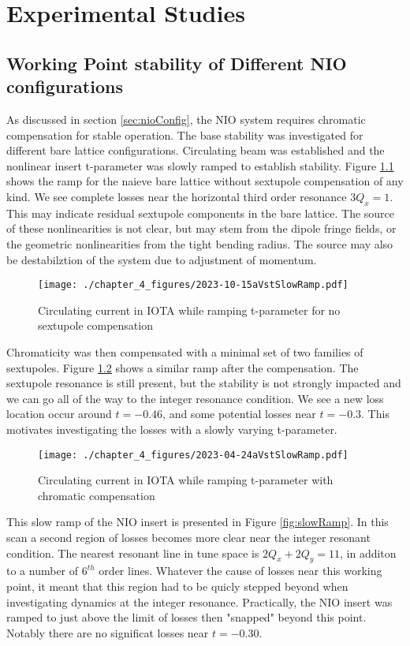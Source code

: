 \chapter{Experimental Studies} \label{chap:expResults}

\section{Working Point stability of Different NIO configurations} \label{sec:nioWorkPoint}
As discussed in section \ref{sec:nioConfig}, the NIO system requires chromatic compensation for stable operation. The base stability was investigated for different bare lattice configurations. Circulating beam was established and the nonlinear insert t-parameter was slowly ramped to establish stability. Figure \ref{fig:bareRamp} shows the ramp for the naieve bare lattice without sextupole compensation of any kind. We see complete losses near the horizontal third order resonance $3 Q_x = 1$. This may indicate residual sextupole components in the bare lattice. The source of these nonlinearities is not clear, but may stem from the dipole fringe fields, or the geometric nonlinearities from the tight bending radius. The source may also be destabilztion of the system due to adjustment of momentum.

\begin{figure}
	\centering
	\texttt{[image: ./chapter\_4\_figures/2023-10-15aVstSlowRamp.pdf]}
	\caption{Circulating current in IOTA while ramping t-parameter for no sextupole compensation}
	\label{fig:bareRamp}
\end{figure}


Chromaticity was then compensated with a minimal set of two families of sextupoles. Figure \ref{fig:midRamp} shows a similar ramp after the compensation. The sextupole resonance is still present, but the stability is not strongly impacted and we can go all of the way to the integer resonance condition. We see a new loss location occur around $t=-0.46$, and some potential losses near $t=-0.3$. This motivates investigating the losses with a slowly varying t-parameter.

\begin{figure}
	\centering
	\texttt{[image: ./chapter\_4\_figures/2023-04-24aVstSlowRamp.pdf]}
	\caption{Circulating current in IOTA while ramping t-parameter with chromatic compensation}
	\label{fig:midRamp}
\end{figure}


This slow ramp of the NIO insert is presented in Figure \ref{fig:slowRamp}. In this scan a second region of losses becomes more clear near the integer resonant condition. The nearest resonant line in tune space is $2Q_x + 2Q_y = 11$, in additon to a number of $6^{th}$ order lines. Whatever the cause of losses near this working point, it meant that this region had to be quicly stepped beyond when investigating dynamics at the integer resonance. Practically, the NIO insert was ramped to just above the limit of losses then "snapped" beyond this point. Notably there are no significat losses near $t=-0.30$.


